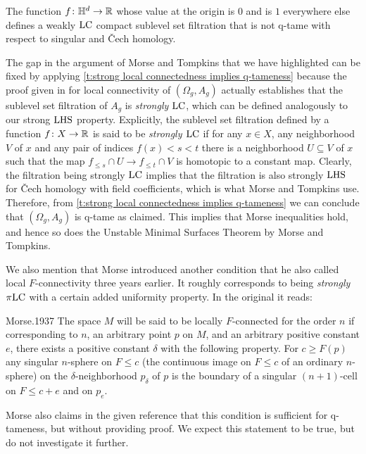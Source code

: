 \begin{cor}
    The function $f \colon \mathbb{H}^d \to \mathbb{R}$ whose value at the origin is $0$ and is $1$ everywhere else defines a weakly $\mathrm{LC}$ compact sublevel set filtration that is not q-tame with respect to singular and \v{C}ech homology.
\end{cor}

The gap in the argument of Morse and Tompkins that we have highlighted can be fixed by applying \cref{t:strong local connectedness implies q-tameness} because the proof given in \cite[p.464]{Morse.1939} for local connectivity of $(\Omega_g, A_g)$ actually establishes that the sublevel set filtration of $A_g$ is \emph{strongly} $\mathrm{LC}$,  which can be defined analogously to our strong $\mathrm{LHS}$ property.
Explicitly, the sublevel set filtration defined by a function $f \colon X \to \mathbb{R}$ is said to be \emph{strongly $\mathrm{LC}$} if for any $x \in X$, any neighborhood $V$ of $x$ and any pair of indices $f(x) < s < t$ there is a neighborhood $U \subseteq V$ of $x$ such that the map $f_{\leq s} \cap U \to f_{\leq t} \cap V$ is homotopic to a constant map.
Clearly, the filtration being strongly $\mathrm{LC}$ implies that the filtration is also strongly $\mathrm{LHS}$ 
for \v{C}ech homology with field coefficients, which is what Morse and Tompkins use.
Therefore, from \cref{t:strong local connectedness implies q-tameness} we can conclude that $(\Omega_g, A_g)$ is q-tame as claimed.
This implies that Morse inequalities hold, and hence so does the Unstable Minimal Surfaces Theorem by Morse and Tompkins.

We also mention that Morse introduced another condition that he also called local $F$-connectivity three years earlier. 
It roughly corresponds to being \emph{strongly} $\pi\mathrm{LC}$ with a certain added uniformity property.
In the original it reads:
\begin{displaycquote}[p.421-422]{Morse.1937}
	The space $M$ will be said to be locally $F$-connected for the order $n$ if corresponding to $n$, an arbitrary point $p$ on $M$, and an arbitrary positive constant $e$, there exists a positive constant $\delta$ with the following property. For $c \geq F(p)$ any singular $n$-sphere on $F \leq c$ (the continuous image on $F \leq c$ of an ordinary $n$-sphere) on the $\delta$-neighborhood $p_{\delta}$ of $p$ is the boundary of a singular $(n + 1)$-cell on $F \leq c + e$ and on $p_e$.
\end{displaycquote}
Morse also claims in the given reference that this condition is sufficient for q-tameness, but without providing proof. 
We expect this statement to be true, but do not investigate it further.